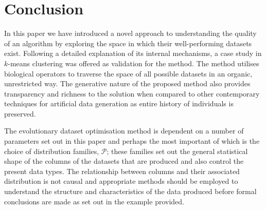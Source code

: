 \section{Conclusion}

In this paper we have introduced a novel approach to understanding the quality
of an algorithm by exploring the space in which their well-performing datasets
exist. Following a detailed explanation of its internal mechanisms, a case study
in \(k\)-means clustering was offered as validation for the method. The method
utilises biological operators to traverse the space of all possible datasets in
an organic, unrestricted way. The generative nature of the proposed method also
provides transparency and richness to the solution when compared to other
contemporary techniques for artificial data generation as entire history of
individuals is preserved.

The evolutionary dataset optimisation method is dependent on a number of
parameters set out in this paper and perhaps the most important of which is the
choice of distribution families, \(\mathcal{P}\); these families set out the
general statistical shape of the columns of the datasets that are produced and
also control the present data types. The relationship between columns and their
associated distribution is not causal and appropriate methods should be
employed to understand the structure and characteristics of the data produced
before formal conclusions are made as set out in the example provided.
